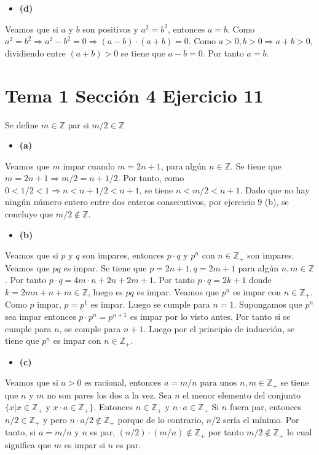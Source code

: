 \documentclass{article}
\begin{document}
\begin{itemize}
\item \bf (d) \rm
\end{itemize}
Veamos que si $a$ y $b$ son positivos y $a^2=b^2$, entonces $a=b$. Como $a^2=b^2\Rightarrow a^2-b^2=0\Rightarrow (a-b)\cdot(a+b)=0$. Como $a>0, b>0\Rightarrow a+b>0$, dividiendo entre $(a+b)>0$ se tiene que $a-b=0$. Por tanto $a=b$.
\section{Tema 1 Sección 4 Ejercicio 11}
Se define $m\in \mathbb{Z}$ par si $m/2\in \mathbb{Z}$
\begin{itemize}
\item \bf (a) \rm
\end{itemize}
Veamos que $m$ impar cuando $m=2n+1$, para algún $n\in \mathbb{Z}$. Se tiene que $m=2n+1\Rightarrow m/2=n+1/2$. Por tanto, como $0<1/2<1\Rightarrow n<n+1/2<n+1$, se tiene $n<m/2<n+1$. Dado que no hay ningún número entero entre dos enteros consecutivos, por ejercicio 9 (b), se concluye que $m/2\notin\mathbb{Z}$.
\begin{itemize}
\item \bf (b) \rm
\end{itemize}
Veamos que si $p$ y $q$ son impares, entonces $p\cdot q$ y $p^n$ con $n\in \mathbb{Z}_{+}$ son impares. Veamos que $pq$ es impar. Se tiene que $p=2n+1,q=2m+1$ para algún $n,m\in \mathbb{Z}$. Por tanto $p\cdot q = 4m\cdot n +2n+2m+1$. Por tanto $p\cdot q = 2k+1$ donde $ k= 2mn+n+m \in \mathbb{Z}$, luego es $pq$ es impar. Veamos que $p^n$ es impar con $n\in \mathbb{Z}_{+}$. Como $p$ impar, $p=p^1$ es impar. Luego se cumple para $n=1$. Supongamos que $p^n$ sea impar entonces $p\cdot p^n= p^{n+1}$ es impar por lo visto antes. Por tanto si se cumple para $n$, se comple para $n+1$. Luego por el principio de inducción, se tiene que $p^n$ es impar con $n\in \mathbb{Z}_{+}$.
\begin{itemize}
\item \bf (c) \rm
\end{itemize}
Veamos que si $a>0$ es racional, entonces $a=m/n$ para unos $n,m \in\mathbb{Z}_{+}$ se tiene que $n$ y $m$ no son pares los dos a la vez. Sea $n$ el menor elemento del conjunto $\{x| x\in\mathbb{Z}_{+}\text{ y } x\cdot a \in\mathbb{Z}_{+}\}$. Entonces $n\in\mathbb{Z}_{+}\text{ y } n\cdot a \in\mathbb{Z}_{+}$ Si $n$ fuera par, entonces $n/2\in\mathbb{Z}_{+}$  y pero $n\cdot a/2 \notin\mathbb{Z}_{+}$ porque de lo contrario, $n/2$ sería el mínimo. Por tanto, si $a=m/n$ y $n$ es par, $(n/2)\cdot (m/n)\notin\mathbb{Z}_{+}$ por tanto $m/2\notin\mathbb{Z}_{+}$ lo cual significa que $m$ es impar si $n$ es par.
\end{document}
